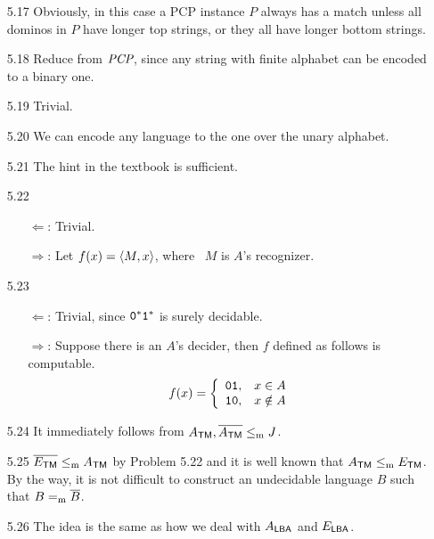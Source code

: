 \begin{itemize}
	\item[5.17]
	Obviously, in this case a PCP instance $P$ always has a match unless all dominos in $P$ have longer top strings, or they all have longer bottom strings.
	
	\item[5.18]
	Reduce from $\IT{PCP}$, since any string with finite alphabet can be encoded to a binary one.
	
	\item[5.19]
	Trivial.
	
	\item[5.20]
	We can encode any language to the one over the unary alphabet.
	
	\item[5.21]
	The hint in the textbook is sufficient.
	
	\item[5.22]
	\begin{itemize}
		\item[$\Leftarrow$:] Trivial.
		\item[$\Rightarrow$:] Let $f(x) = \Bra{M, x}$, where \TM\ $M$ is $A$'s recognizer. 
	\end{itemize}

	\item[5.23]
	\begin{itemize}
		\item[$\Leftarrow$:] Trivial, since $\TT{0}^*\TT{1}^*$ is surely decidable.
		\item[$\Rightarrow$:] Suppose there is an $A$'s decider, then $f$ defined as follows is computable.
		\[
			f(x) = 
			\left\{
				\begin{array}{ll}
					\TT{01}, & x \in A \\
					\TT{10}, & x \notin A
				\end{array}
			\right.
		\]
	\end{itemize}

	\item[5.24]
	It immediately follows from $A_{\TM}, \overline{A_{\TM}} \Leqm J$.
	
	\item[5.25]
	$\overline{E_{\TM}} \Leqm A_{\TM}$ by Problem 5.22 and it is well known that $A_{\TM} \Leqm E_{\TM}$. By the way, it is not difficult to construct an undecidable language $B$ such that $B =_{\RM{m}} \overline{B}$.
	
	\item[5.26]
	The idea is the same as how we deal with $A_{\LBA}$ and $E_{\LBA}$.
	

\end{itemize}
